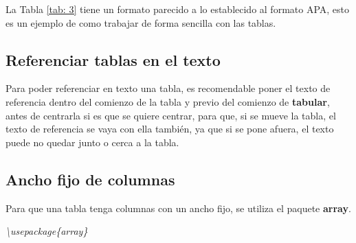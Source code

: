 La Tabla \ref{tab: 3} tiene un formato parecido a lo establecido al formato APA, esto es un ejemplo de como trabajar de forma sencilla con las tablas.


\subsection{Referenciar tablas en el texto}
\hspace{0.55cm}Para poder referenciar en texto una tabla, es recomendable poner el texto de referencia dentro del comienzo de la tabla y previo del comienzo de \textbf{tabular}, antes de centrarla si es que se quiere centrar, para que, si se mueve la tabla, el texto de referencia se vaya con ella también, ya que si se pone afuera, el texto puede no quedar junto o cerca a la tabla.


\subsection{Ancho fijo de columnas}
\hspace{0.55cm}Para que una tabla tenga columnas con un ancho fijo, se utiliza el paquete \textbf{array}.
\begin{center}
    \textit{\textbackslash{usepackage\{array\}}}
\end{center}

